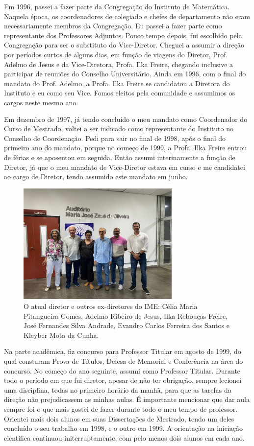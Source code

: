 \documentclass{hipatia}
\begin{document}
Em 1996, passei a fazer parte da Congregação do Instituto de
Matemática. Naquela época, os coordenadores de colegiado e
chefes de departamento não eram necessariamente membros da
Congregação. Eu passei a fazer parte como representante dos
Professores Adjuntos. Pouco tempo depois, fui escolhido pela
Congregação para ser o substituto do Vice-Diretor. Cheguei a
assumir a direção por períodos curtos de alguns dias, em
função de viagens do Diretor, Prof. Adelmo de Jesus e da
Vice-Diretora, Profa. Ilka Freire, chegando inclusive a
participar de reuniões do Conselho Universitário. Ainda em
1996, com o final do mandato do Prof. Adelmo, a Profa. Ilka
Freire se candidatou a Diretora do Instituto e eu como seu
Vice. Fomos eleitos pela comunidade e assumimos os cargos
neste mesmo ano.

Em dezembro de 1997, já tendo concluído o meu mandato como
Coordenador do Curso de Mestrado, voltei a ser indicado como
representante do Instituto no Conselho de Coordenação. Pedi
para sair no final de 1998, após o final do primeiro ano do
mandato, porque no começo de 1999, a Profa. Ilka Freire
entrou de férias e se aposentou em seguida. Então assumi
interinamente a função de Diretor, já que o meu mandato de
Vice-Diretor estava em curso e me candidatei ao cargo de
Diretor, tendo assumido este mandato em junho. 

\begin{figure}[htb!]
\begin{center}
\includegraphics[width=8cm]{Encontro.jpeg}
\end{center}
\caption{O atual diretor e outros ex-diretores do IME: 
 Célia Maria Pitangueira Gomes, Adelmo Ribeiro de Jesus, 
 Ilka Rebouças Freire, José Fernandes Silva Andrade, 
 Evandro Carlos Ferreira dos Santos e Kleyber Mota da Cunha.
}
\end{figure}

Na parte acadêmica, fiz concurso para Professor Titular em
agosto de 1999, do qual constaram Prova de Títulos, Defesa
de Memorial e Conferência na área do concurso. No começo do
ano seguinte, assumi como Professor Titular. Durante todo o
período em que fui diretor, apesar de não ter obrigação,
sempre lecionei uma disciplina, todas no primeiro horário da
manhã, para que as tarefas da direção não prejudicassem as
minhas aulas. É importante mencionar que dar aula sempre foi
o que mais gostei de fazer durante todo o meu tempo de
professor. Orientei mais dois alunos em suas Dissertações de
Mestrado, tendo um deles concluído o seu trabalho em 1998, e
o outro em 1999. A orientação na iniciação científica
continuou initerruptamente, com pelo menos dois alunos em
cada ano.
\end{document}
